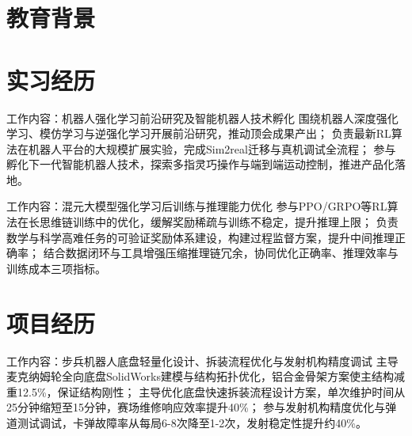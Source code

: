 \documentclass{resume}
\begin{document}

\sepspace
{}


\section{教育背景}



\section{实习经历}
{工作内容：机器人强化学习前沿研究及智能机器人技术孵化}
\Content
{ 围绕机器人深度强化学习、模仿学习与逆强化学习开展前沿研究，推动顶会成果产出；}
{ 负责最新RL算法在机器人平台的大规模扩展实验，完成Sim2real迁移与真机调试全流程；}
{ 参与孵化下一代智能机器人技术，探索多指灵巧操作与端到端运动控制，推进产品化落地。}

{工作内容：混元大模型强化学习后训练与推理能力优化}
\Content
{ 参与PPO/GRPO等RL算法在长思维链训练中的优化，缓解奖励稀疏与训练不稳定，提升推理上限；}
{ 负责数学与科学高难任务的可验证奖励体系建设，构建过程监督方案，提升中间推理正确率；}
{ 结合数据闭环与工具增强压缩推理链冗余，协同优化正确率、推理效率与训练成本三项指标。}


\section{项目经历}

{工作内容：步兵机器人底盘轻量化设计、拆装流程优化与发射机构精度调试}
\Content
{ 主导麦克纳姆轮全向底盘SolidWorks建模与结构拓扑优化，铝合金骨架方案使主结构减重12.5\%，保证结构刚性；}
{ 主导优化底盘快速拆装流程设计方案，单次维护时间从25分钟缩短至15分钟，赛场维修响应效率提升40\%；}
{ 参与发射机构精度优化与弹道测试调试，卡弹故障率从每局6-8次降至1-2次，发射稳定性提升约40\%。}
\end{document}
